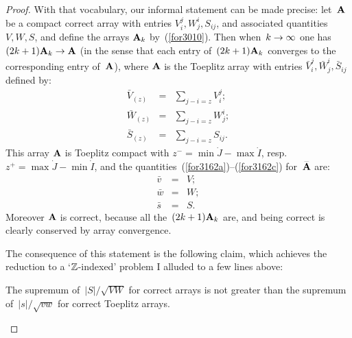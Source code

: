 \begin{proof}
With that vocabulary, our informal statement can be made precise:
let~$\mathbf{A}$ be a compact correct array with entries $V_i^j, W_j^i, S_{ij}$,
and associated quantities $V, W, S$,
and define the arrays $\mathbf{A}_k$ by~(\ref{for3010}).
Then when~$k \to \infty$ one has $(2k+1) \mbf{A}_k \longto \bar{\mbf{A}}$ (in the sense that
each entry of~$(2k+1) \mathbf{A}_k$ converges to the corresponding entry of~$\bar{\mbf{A}}$),
where $\bar{\mbf{A}}$ is the Toeplitz array with entries $\bar{V}_i^j,\bar{W}_j^i,\bar{S}_{ij}$
defined by:
\begin{eqnarray}
\bar{V}_{(z)} &=& \sum_{j-i=z} V_i^j ; \\ 
\bar{W}_{(z)} &=& \sum_{j-i=z} W_j^i ; \\
\bar{S}_{(z)} &=& \sum_{j-i=z} S_{ij}.
\end{eqnarray}
%
This array $\bar{\mbf{A}}$ is Toeplitz compact
with $z^-=\min\dot{J}-\max\dot{I}$, resp.\ $z^+=\max\dot{J}-\min\dot{I}$,
and the quantities~(\ref{for3162a})--(\ref{for3162c}) for~$\bar{\mbf{A}}$
are:
\begin{eqnarray}
\bar{v} &=& V ; \\
\bar{w} &=& W ; \\
\bar{s} &=& S.
\end{eqnarray}
Moreover $\bar{\mbf{A}}$ is correct, because all the~$(2k+1) \mathbf{A}_k$ are,
and being correct is clearly conserved by array convergence.

The consequence of this statement is the following claim,
which achieves the reduction to a `$\mathbb{Z}$-indexed' problem
I alluded to a few lines above:
%
\begin{Clm}
The supremum of~$|S|/\sqrt{VW}$ for correct arrays
is not greater than the supremum of~$|s|/\sqrt{vw}$
for correct Toeplitz arrays.
\end{Clm}


\end{proof}
